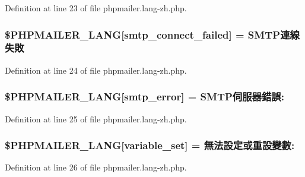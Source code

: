 Definition at line 23 of file phpmailer.\+lang-\/zh.\+php.

\subsubsection[{\texorpdfstring{\$\+P\+H\+P\+M\+A\+I\+L\+E\+R\+\_\+\+L\+A\+NG}{$PHPMAILER_LANG}}]{\setlength{\rightskip}{0pt plus 5cm}\$P\+H\+P\+M\+A\+I\+L\+E\+R\+\_\+\+L\+A\+NG\mbox{[}\textquotesingle{}smtp\+\_\+connect\+\_\+failed\textquotesingle{}\mbox{]} = \textquotesingle{}S\+M\+T\+P連線失敗\textquotesingle{}}\hypertarget{phpmailer_8lang-zh_8php_a7b321d4ca1e9df702403ed4c61aa0980}{}\label{phpmailer_8lang-zh_8php_a7b321d4ca1e9df702403ed4c61aa0980}


Definition at line 24 of file phpmailer.\+lang-\/zh.\+php.

\subsubsection[{\texorpdfstring{\$\+P\+H\+P\+M\+A\+I\+L\+E\+R\+\_\+\+L\+A\+NG}{$PHPMAILER_LANG}}]{\setlength{\rightskip}{0pt plus 5cm}\$P\+H\+P\+M\+A\+I\+L\+E\+R\+\_\+\+L\+A\+NG\mbox{[}\textquotesingle{}smtp\+\_\+error\textquotesingle{}\mbox{]} = \textquotesingle{}S\+M\+T\+P伺服器錯誤\+: \textquotesingle{}}\hypertarget{phpmailer_8lang-zh_8php_a7d9cffba1e669c845f8a4c891ee50064}{}\label{phpmailer_8lang-zh_8php_a7d9cffba1e669c845f8a4c891ee50064}


Definition at line 25 of file phpmailer.\+lang-\/zh.\+php.

\subsubsection[{\texorpdfstring{\$\+P\+H\+P\+M\+A\+I\+L\+E\+R\+\_\+\+L\+A\+NG}{$PHPMAILER_LANG}}]{\setlength{\rightskip}{0pt plus 5cm}\$P\+H\+P\+M\+A\+I\+L\+E\+R\+\_\+\+L\+A\+NG\mbox{[}\textquotesingle{}variable\+\_\+set\textquotesingle{}\mbox{]} = \textquotesingle{}無法設定或重設變數\+: \textquotesingle{}}\hypertarget{phpmailer_8lang-zh_8php_af795debc7a739d038742691c358d9032}{}\label{phpmailer_8lang-zh_8php_af795debc7a739d038742691c358d9032}


Definition at line 26 of file phpmailer.\+lang-\/zh.\+php.

